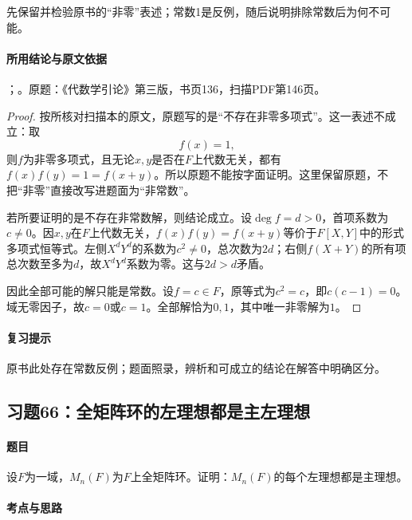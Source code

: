 先保留并检验原书的“非零”表述；常数1是反例，随后说明排除常数后为何不可能。

\paragraph{所用结论与原文依据}

；。原题：《代数学引论》第三版，书页136，扫描PDF第146页。


\begin{proof}

按所核对扫描本的原文，原题写的是“不存在非零多项式”。这一表述不成立：取
\[
f(x)=1,
\]
则$f$为非零多项式，且无论$x,y$是否在$F$上代数无关，都有$f(x)f(y)=1=f(x+y)$。所以原题不能按字面证明。这里保留原题，不把“非零”直接改写进题面为“非常数”。

若所要证明的是不存在非常数解，则结论成立。设$\deg f=d>0$，首项系数为$c\ne0$。因$x,y$在$F$上代数无关，$f(x)f(y)=f(x+y)$等价于$F[X,Y]$中的形式多项式恒等式。左侧$X^dY^d$的系数为$c^2\ne0$，总次数为$2d$；右侧$f(X+Y)$的所有项总次数至多为$d$，故$X^dY^d$系数为零。这与$2d>d$矛盾。

因此全部可能的解只能是常数。设$f=c\in F$，原等式为$c^2=c$，即$c(c-1)=0$。域无零因子，故$c=0$或$c=1$。全部解恰为$0,1$，其中唯一非零解为$1$。

\end{proof}

\paragraph{复习提示}

原书此处存在常数反例；题面照录，辨析和可成立的结论在解答中明确区分。



\subsection{习题66：全矩阵环的左理想都是主左理想}

\label{ex:3:66}

\paragraph{题目}

设$F$为一域，$M_n(F)$为$F$上全矩阵环。证明：$M_n(F)$的每个左理想都是主理想。

\paragraph{考点与思路}

